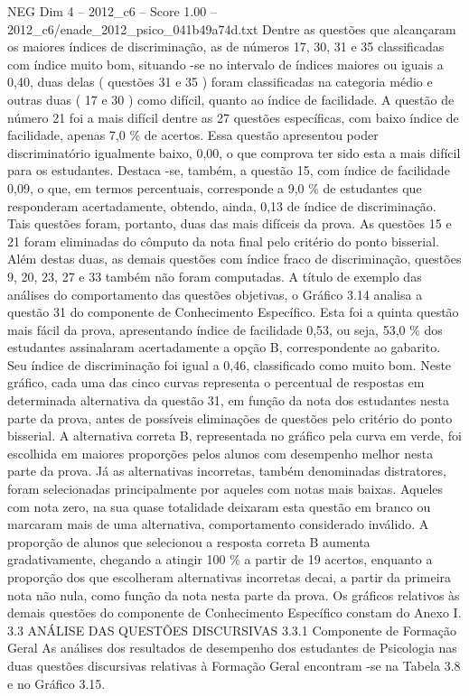 \begin{textsample}{NEG Dim 4 – 2012\_c6 – Score 1.00 – 2012\_c6/enade\_2012\_psico\_041b49a74d.txt}
Dentre as questões que alcançaram os maiores índices de discriminação, as de números 17, 30, 31 e 35 classificadas com índice muito bom, situando -se no intervalo de índices maiores ou iguais a 0,40, duas delas ( questões 31 e 35 ) foram classificadas na categoria médio e outras duas ( 17 e 30 ) como difícil, quanto ao índice de facilidade.
A questão de número 21 foi a mais difícil dentre as 27 questões específicas, com baixo índice de facilidade, apenas 7,0 \% de acertos.
Essa questão apresentou poder discriminatório igualmente baixo, 0,00, o que comprova ter sido esta a mais difícil para os estudantes.
Destaca -se, também, a questão 15, com índice de facilidade 0,09, o que, em termos percentuais, corresponde a 9,0 \% de estudantes que responderam acertadamente, obtendo, ainda, 0,13 de índice de discriminação.
Tais questões foram, portanto, duas das mais difíceis da prova.
As questões 15 e 21 foram eliminadas do cômputo da nota final pelo critério do ponto bisserial.
Além destas duas, as demais questões com índice fraco de discriminação, questões 9, 20, 23, 27 e 33 também não foram computadas.
A título de exemplo das análises do comportamento das questões objetivas, o Gráfico 3.14 analisa a questão 31 do componente de Conhecimento Específico.
Esta foi a quinta questão mais fácil da prova, apresentando índice de facilidade 0,53, ou seja, 53,0 \% dos estudantes assinalaram acertadamente a opção B, correspondente ao gabarito.
Seu índice de discriminação foi igual a 0,46, classificado como muito bom.
Neste gráfico, cada uma das cinco curvas representa o percentual de respostas em determinada alternativa da questão 31, em função da nota dos estudantes nesta parte da prova, antes de possíveis eliminações de questões pelo critério do ponto bisserial.
A alternativa correta B, representada no gráfico pela curva em verde, foi escolhida em maiores proporções pelos alunos com desempenho melhor nesta parte da prova.
Já as alternativas incorretas, também denominadas distratores, foram selecionadas principalmente por aqueles com notas mais baixas.
Aqueles com nota zero, na sua quase totalidade deixaram esta questão em branco ou marcaram mais de uma alternativa, comportamento considerado inválido.
A proporção de alunos que selecionou a resposta correta B aumenta gradativamente, chegando a atingir 100 \% a partir de 19 acertos, enquanto a proporção dos que escolheram alternativas incorretas decai, a partir da primeira nota não nula, como função da nota nesta parte da prova.
Os gráficos relativos às demais questões do componente de Conhecimento Específico constam do Anexo I. 3.3 ANÁLISE DAS QUESTÕES DISCURSIVAS 3.3.1 Componente de Formação Geral As análises dos resultados de desempenho dos estudantes de Psicologia nas duas questões discursivas relativas à Formação Geral encontram -se na Tabela 3.8 e no Gráfico 3.15.

\end{textsample}
